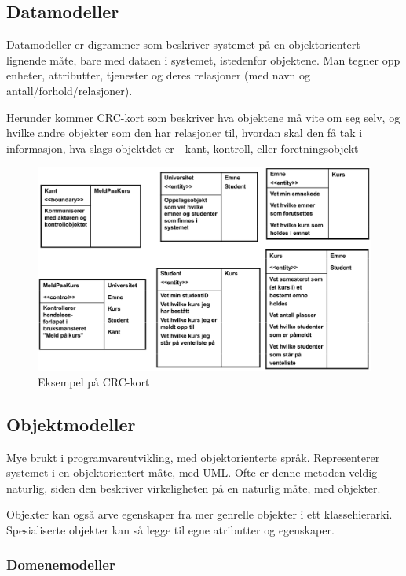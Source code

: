 \documentclass[11pt]{article}
\begin{document}
\subsection{Datamodeller}
\label{sec-7.3}


   Datamodeller er digrammer som beskriver systemet på en objektorientert-lignende måte, 
   bare med dataen i systemet, istedenfor objektene. Man tegner opp enheter, attributter, 
   tjenester og deres relasjoner (med navn og antall/forhold/relasjoner). 

   Herunder kommer CRC-kort som beskriver hva objektene må vite om seg selv, og hvilke andre
   objekter som den har relasjoner til, hvordan skal den få tak i informasjon, hva 
   slags objektdet er - kant, kontroll, eller foretningsobjekt
   
   \begin{figure}[htb]
   \centering
   \includegraphics[width=\textwidth]{./CRC.eps}
   \caption{\label{fig:CRC-kort}Eksempel på CRC-kort}
   \end{figure}
\subsection{Objektmodeller}
\label{sec-7.4}


   Mye brukt i programvareutvikling, med objektorienterte språk. 
   Representerer systemet i en objektorientert måte, med UML. 
   Ofte er denne metoden veldig naturlig, siden den beskriver 
   virkeligheten på en naturlig måte, med objekter. 

   Objekter kan også arve egenskaper fra mer genrelle objekter i ett klassehierarki. 
   Spesialiserte objekter kan så legge til egne atributter og egenskaper.
\subsubsection{Domenemodeller}
\label{sec-7.4.1}
\end{document}
